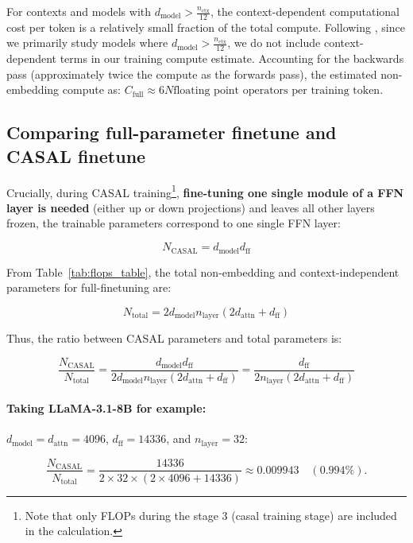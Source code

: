 \documentclass{article} %
\begin{document}
For contexts and models with $d_{\text{model}} > \frac{n_{\text{ctx}}}{12}$, the context-dependent 
computational cost per token is a relatively small fraction of the total compute. Following \cite{kaplan2020scalinglawsneurallanguage},
since we primarily study models where $d_{\text{model}} > \frac{n_{\text{ctx}}}{12}$, we do not 
include context-dependent terms in our training compute estimate. 
Accounting for the backwards pass (approximately twice the compute as the forwards pass), 
 the estimated non-embedding compute as: $C_{
 \text{full}
 } \approx 6N  \text{floating point operators per training token.}$

\subsection{ Comparing full-parameter finetune and CASAL finetune} 
\label{app:casal_comparison}

Crucially, during CASAL training\footnote{Note that only FLOPs during the stage 3 (casal training stage) are included in the calculation.}, \textbf{ fine-tuning one single module of a FFN layer is needed} (either up or down projections) and leaves all other layers frozen, 
the trainable parameters correspond to one single FFN layer:

\[
N_{\text{CASAL}} = d_{\text{model}}d_{\text{ff}} 
\]

From Table~\ref{tab:flops_table}, the total non-embedding and context-independent parameters for full-finetuning are:

\[
N_{\text{total}} = 2d_{\text{model}}n_{\text{layer}}\left( 2d_{\text{attn}} + d_{\text{ff}} \right) 
\]

Thus, the ratio between CASAL parameters and total parameters is:

\[
\frac{N_{\text{CASAL}}}{N_{\text{total}}} 
= \frac{ d_{\text{model}}d_{\text{ff}} }{ 2d_{\text{model}}n_{\text{layer}}\left( 2d_{\text{attn}} + d_{\text{ff}} \right) }
= \frac{ d_{\text{ff}} }{ 2n_{\text{layer}} \left( 2d_{\text{attn}} + d_{\text{ff}} \right) } 
\]

\paragraph{Taking LLaMA-3.1-8B for example:}
 $d_{\text{model}} = d_{\text{attn}} = 4096$, $d_{\text{ff}} = 14336$, and $n_{\text{layer}} = 32$:

\[
\frac{N_{\text{CASAL}}}{N_{\text{total}}} 
= \frac{14336}{2 \times 32 \times \left( 2 \times 4096 + 14336 \right)} 
\approx 0.009943 \quad (\mathbf{0.994\%}).
\]
\end{document}
